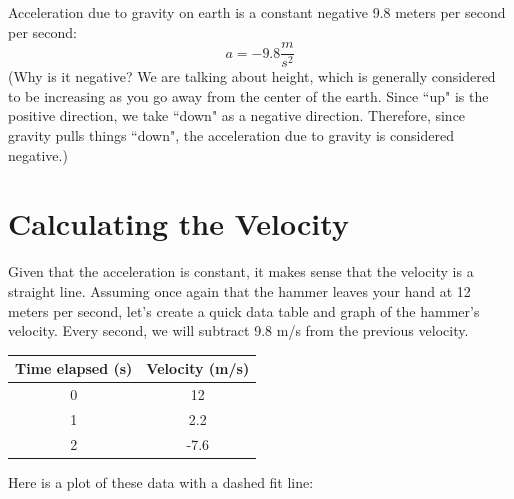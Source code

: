 Acceleration due to gravity on earth is a constant negative 9.8 meters per second per second:
\begin{equation*}
a = -9.8 \frac{m}{s^2}  
\end{equation*}
(Why is it negative? We are talking about height, which is generally considered to be increasing as
you go away from the center of the earth. Since ``up" is the positive direction, we take ``down" as a negative direction. Therefore, since gravity pulls things ``down", the acceleration due to gravity is considered negative.)

\section{Calculating the Velocity}

Given that the acceleration is constant, it makes sense that the
velocity is a straight line. Assuming once again that the hammer
leaves your hand at 12 meters per second, let's create a quick data table and 
graph of the hammer's velocity. Every second, we will subtract 9.8 m/s from the 
previous velocity. 

\begin{center}
\begin{tabular}{|c|c|}\hline
Time elapsed (s) & Velocity (m/s)\\\hline
0 & 12\\\hline
1 & 2.2\\\hline
2 & -7.6\\\hline
\end{tabular}
\end{center}

Here is a plot of these data with a dashed fit line:
\begin{center}
\end{center}

